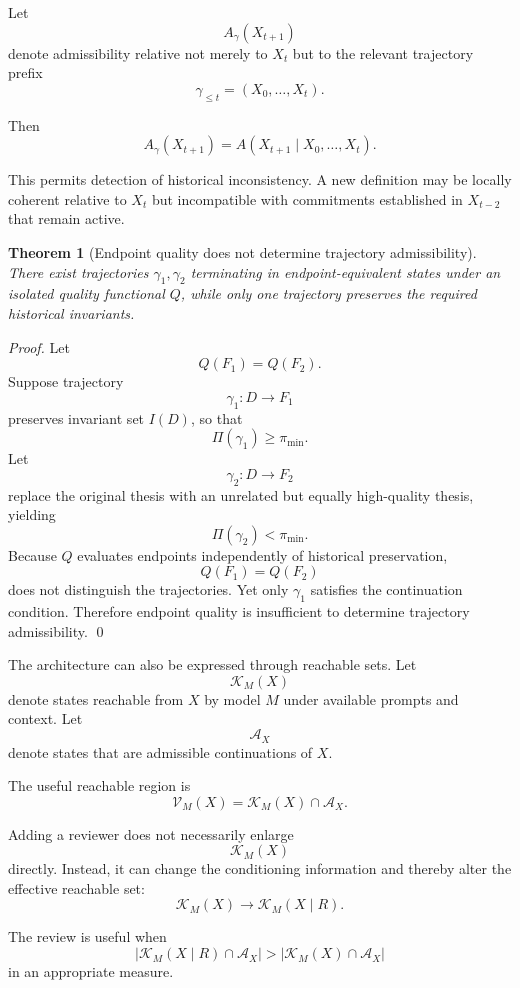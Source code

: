 \documentclass[11pt]{article}
\newtheorem{theorem}[definition]{Theorem}
\begin{document}
Let
\[
    A_\gamma(X_{t+1})
\]
denote admissibility relative not merely to \(X_t\) but to the relevant trajectory prefix
\[
    \gamma_{\leq t}
    =
    (X_0,\ldots,X_t).
\]

Then
\[
    A_\gamma(X_{t+1})
    =
    A
    \left(
        X_{t+1}
        \mid
        X_0,\ldots,X_t
    \right).
\]

This permits detection of historical inconsistency. A new definition may be locally coherent relative to \(X_t\) but incompatible with commitments established in \(X_{t-2}\) that remain active.

\begin{theorem}[Endpoint quality does not determine trajectory admissibility]
There exist trajectories \(\gamma_1,\gamma_2\) terminating in endpoint-equivalent states under an isolated quality functional \(Q\), while only one trajectory preserves the required historical invariants.
\end{theorem}

\begin{proof}
Let
\[
    Q(F_1)=Q(F_2).
\]
Suppose trajectory
\[
    \gamma_1:
    D\rightarrow F_1
\]
preserves invariant set \(I(D)\), so that
\[
    \Pi(\gamma_1)\geq\pi_{\min}.
\]
Let
\[
    \gamma_2:
    D\rightarrow F_2
\]
replace the original thesis with an unrelated but equally high-quality thesis, yielding
\[
    \Pi(\gamma_2)<\pi_{\min}.
\]
Because \(Q\) evaluates endpoints independently of historical preservation,
\[
    Q(F_1)=Q(F_2)
\]
does not distinguish the trajectories. Yet only \(\gamma_1\) satisfies the continuation condition. Therefore endpoint quality is insufficient to determine trajectory admissibility. \qed
\end{proof}

The architecture can also be expressed through reachable sets. Let
\[
    \mathcal{K}_M(X)
\]
denote states reachable from \(X\) by model \(M\) under available prompts and context. Let
\[
    \mathcal{A}_X
\]
denote states that are admissible continuations of \(X\).

The useful reachable region is
\[
    \mathcal{V}_M(X)
    =
    \mathcal{K}_M(X)\cap\mathcal{A}_X.
\]

Adding a reviewer does not necessarily enlarge
\[
    \mathcal{K}_M(X)
\]
directly. Instead, it can change the conditioning information and thereby alter the effective reachable set:
\[
    \mathcal{K}_M(X)
    \rightarrow
    \mathcal{K}_M(X\mid R).
\]

The review is useful when
\[
    \left|
        \mathcal{K}_M(X\mid R)
        \cap
        \mathcal{A}_X
    \right|
    >
    \left|
        \mathcal{K}_M(X)
        \cap
        \mathcal{A}_X
    \right|
\]
in an appropriate measure.
\end{document}
